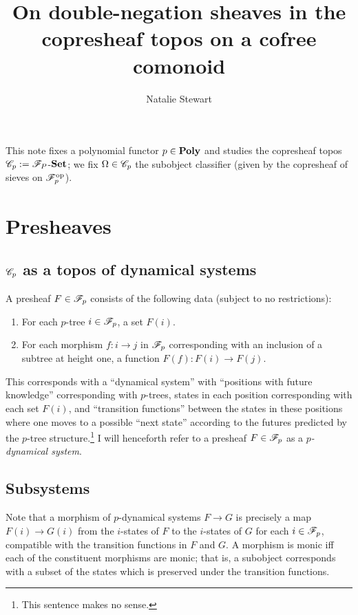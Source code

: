 \documentclass{amsart}
\begin{document}
\title{On double-negation sheaves in the copresheaf topos on a cofree comonoid}
\author{Natalie Stewart}
\maketitle

This note fixes a polynomial functor $p \in \mathbf{Poly}$ and studies the copresheaf topos $\mathscr{C}_p := \mathscr{F}_P$-$\mathbf{Set}$;
we fix $\Omega \in \mathscr{C}_p$ the subobject classifier (given by the copresheaf of sieves on $\mathscr{F}_p^{\text{op}}$).

\section{Presheaves}
\subsection{$\mathscr{C}_p$ as a topos of dynamical systems}
A presheaf $F \in \mathscr{F}_p$ consists of the following data (subject to no restrictions):
\begin{enumerate}
  \item For each $p$-tree $i \in \mathscr{F}_p$, a set $F(i)$.
  \item For each morphism $f:i \rightarrow j$ in $\mathscr{F}_p$ corresponding with an inclusion of a subtree at height one, a function $F(f):F(i) \rightarrow F(j)$. 
\end{enumerate}
This corresponds with a ``dynamical system'' with ``positions with future knowledge'' corresponding with $p$-trees, states in each position corresponding with each set $F(i)$, and ``transition functions'' between the states in these positions where one moves to a possible ``next state'' according to the futures predicted by the $p$-tree structure.\footnote{\color{magenta} This sentence makes no sense.}
I will henceforth refer to a presheaf $F \in \mathscr{F}_p$ as a \emph{$p$-dynamical system}.

\subsection{Subsystems}
Note that a morphism of $p$-dynamical systems $F \rightarrow G$ is precisely a map $F(i) \rightarrow G(i)$ from the $i$-states of $F$ to the $i$-states of $G$ for each $i \in \mathscr{F}_p$, compatible with the transition functions in $F$ and $G$.
A morphism is monic iff each of the constituent morphisms are monic;
that is, a subobject corresponds with a subset of the states which is preserved under the transition functions.
\end{document}

